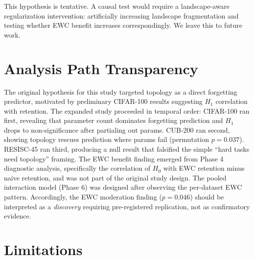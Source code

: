 \documentclass[10pt,twocolumn]{article}
\begin{document}
This hypothesis is tentative. A causal test would require a landscape-aware regularization intervention: artificially increasing landscape fragmentation and testing whether EWC benefit increases correspondingly. We leave this to future work.

\section{Analysis Path Transparency}
\label{sec:transparency}

The original hypothesis for this study targeted topology as a direct forgetting predictor, motivated by preliminary CIFAR-100 results suggesting $H_1$ correlation with retention. The expanded study proceeded in temporal order: CIFAR-100 ran first, revealing that parameter count dominates forgetting prediction and $H_1$ drops to non-significance after partialing out params. CUB-200 ran second, showing topology rescues prediction where params fail (permutation $p = 0.037$). RESISC-45 ran third, producing a null result that falsified the simple ``hard tasks need topology'' framing. The EWC benefit finding emerged from Phase 4 diagnostic analysis, specifically the correlation of $H_0$ with EWC retention minus naive retention, and was not part of the original study design. The pooled interaction model (Phase 6) was designed after observing the per-dataset EWC pattern. Accordingly, the EWC moderation finding ($p = 0.046$) should be interpreted as a \emph{discovery} requiring pre-registered replication, not as confirmatory evidence.

\section{Limitations}
\label{sec:limitations}
\end{document}
